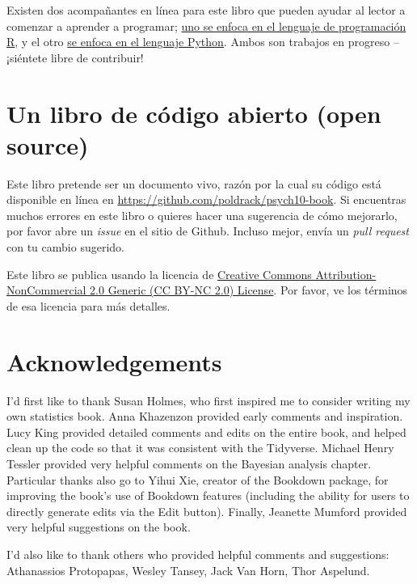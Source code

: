\documentclass[
  12pt,
]{book}
\theoremstyle{definition}
\theoremstyle{definition}
\theoremstyle{definition}
\theoremstyle{remark}
\begin{document}
Existen dos acompañantes en línea para este libro que pueden ayudar al lector a comenzar a aprender a programar; \href{https://statsthinking21.github.io/statsthinking21-R-site/}{uno se enfoca en el lenguaje de programación R}, y el otro \href{https://statsthinking21.github.io/statsthinking21-python/}{se enfoca en el lenguaje Python}. Ambos son trabajos en progreso -- ¡siéntete libre de contribuir!

\hypertarget{un-libro-de-cuxf3digo-abierto-open-source}{%
\section{Un libro de código abierto (open source)}\label{un-libro-de-cuxf3digo-abierto-open-source}}

Este libro pretende ser un documento vivo, razón por la cual su código está disponible en línea en \url{https://github.com/poldrack/psych10-book}. Si encuentras muchos errores en este libro o quieres hacer una sugerencia de cómo mejorarlo, por favor abre un \emph{issue} en el sitio de Github. Incluso mejor, envía un \emph{pull request} con tu cambio sugerido.

Este libro se publica usando la licencia de \href{https://creativecommons.org/licenses/by-nc/2.0/}{Creative Commons Attribution-NonCommercial 2.0 Generic (CC BY-NC 2.0) License}. Por favor, ve los términos de esa licencia para más detalles.

\hypertarget{acknowledgements}{%
\section{Acknowledgements}\label{acknowledgements}}

I'd first like to thank Susan Holmes, who first inspired me to consider writing my own statistics book. Anna Khazenzon provided early comments and inspiration. Lucy King provided detailed comments and edits on the entire book, and helped clean up the code so that it was consistent with the Tidyverse. Michael Henry Tessler provided very helpful comments on the Bayesian analysis chapter. Particular thanks also go to Yihui Xie, creator of the Bookdown package, for improving the book's use of Bookdown features (including the ability for users to directly generate edits via the Edit button). Finally, Jeanette Mumford provided very helpful suggestions on the book.

I'd also like to thank others who provided helpful comments and suggestions: Athanassios Protopapas, Wesley Tansey, Jack Van Horn, Thor Aspelund.
\end{document}
